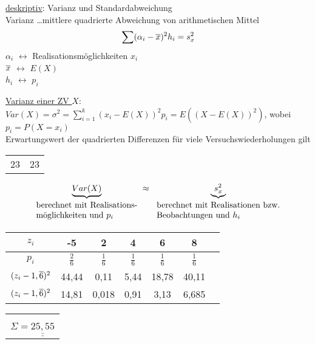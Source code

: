 \underline{deskriptiv}: Varianz und Standardabweichung \\
Varianz \dots mittlere quadrierte Abweichung von arithmetischen Mittel
	$$ \sum (\alpha_i - \overline{x})^2 h_i = s_x^2$$
$\alpha_i$ $\leftrightarrow$ Realisationsmöglichkeiten $x_i$ \\
$\overline{x}$ $\leftrightarrow$ $E(X)$	\\
$h_i$ $\leftrightarrow$ $p_i$

\underline{Varianz einer ZV $X$}: 
	$Var(X) = \sigma^2 = \sum_{i=1}^{k}(x_i - E(X))^2 p_i		
		= E((X-E(X))^2)$, wobei $p_i = P(X=x_i)$\\
Erwartungswert der quadrierten Differenzen für viele Versuchswiederholungen gilt  

\begin{tabular}{p{0.5\linewidth} p{0.5\linewidth}}
\hfill 23 & 23 \hfill\\
\end{tabular}

\def\varA{\mbox{
	\begin{tabular}{@{}l@{}}
		berechnet mit Realisations-\\möglichkeiten und $p_i$
	\end{tabular}
	}
	\hspace{0em}
}
\def\varB{\mbox{
	\begin{tabular}{@{}l@{}}
		berechnet mit Realisationen bzw.\\ Beobachtungen und $h_i$
	\end{tabular}
	}
	\hspace{0em}
}

	$$ \underbrace{Var(X)}_{\varA} \approx \; \underbrace{s_x^2}_{\varB}$$

\begin{tabular}{c | c | c | c | c | c l }
$z_i$	  & -5 & 2 & 4 & 6 & 8\\
\hline
$p_i$  &  $\frac{2}{6}$  & $\frac{1}{6}$ & $\frac{1}{6}$ & $\frac{1}{6}$ & $\frac{1}{6}$ \\
$(z_i -1,\overline{6})^2$ & 44,44 & 0,11 & 5,44 & 18,78 & 40,11 \\
$(z_i -1,\overline{6})^2$ & 14,81 & 0,018 & 0,91 & 3,13 & 6,685 \\
\end{tabular}
\begin{tabular}{l}
\\ \\ \\
$\Sigma = \underline{\underline{25,55}}$	
\end{tabular}

